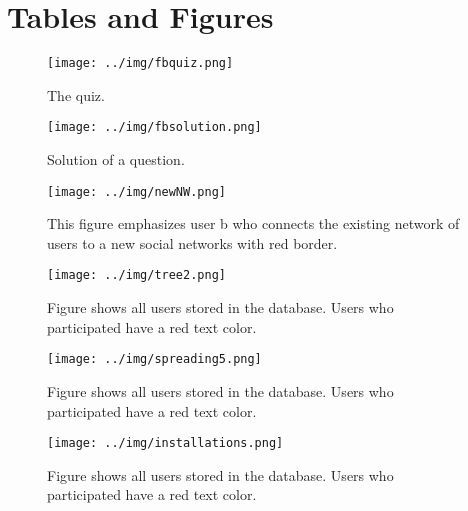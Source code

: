 \documentclass[preprint,12pt]{elsarticle}
\begin{document}





\newpage
\section{Tables and Figures}
\label{sec:addendum}

\begin{figure}
  \texttt{[image: ../img/fbquiz.png]}
 \caption{The quiz.}
\label{fig:quiz}
\end{figure}


\begin{figure}
  \texttt{[image: ../img/fbsolution.png]}
  \caption{Solution of a question.}
\label{fig:solution}
\end{figure}

\begin{figure}
  \texttt{[image: ../img/newNW.png]}
 \caption{This figure emphasizes user b who connects the existing
   network of users to a new social networks with
   red border.}
\label{fig:newNW}
\end{figure}


\begin{figure}
  \texttt{[image: ../img/tree2.png]}
\caption{Figure shows all users stored in the database. Users who
  participated have a red text color.}
\label{fig:allUsers}
\end{figure}

\begin{figure}
  \texttt{[image: ../img/spreading5.png]}
\caption{Figure shows all users stored in the database. Users who
  participated have a red text color.}
\label{fig:spreading}
\end{figure}

\begin{figure}
  \texttt{[image: ../img/installations.png]}
\caption{Figure shows all users stored in the database. Users who
  participated have a red text color.}
\label{fig:installations}
\end{figure}
\end{document}
